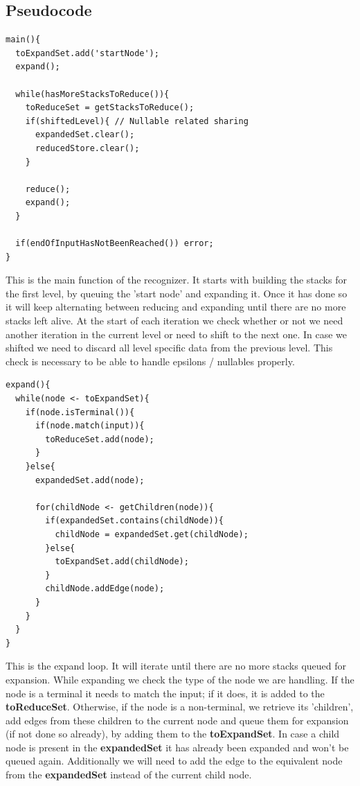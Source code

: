 \documentclass[a4paper,10pt]{article}
\begin{document}
\subsection{Pseudocode}

{\small
\begin{verbatim}
main(){
  toExpandSet.add('startNode');
  expand();
  
  while(hasMoreStacksToReduce()){
    toReduceSet = getStacksToReduce();
    if(shiftedLevel){ // Nullable related sharing
      expandedSet.clear();
      reducedStore.clear();
    }
    
    reduce();
    expand();
  }
  
  if(endOfInputHasNotBeenReached()) error;
}
\end{verbatim}
}

This is the main function of the recognizer. It starts with building the stacks for the first level, by queuing the 'start node' and expanding it. Once it has done so it will keep alternating between reducing and expanding until there are no more stacks left alive. At the start of each iteration we check whether or not we need another iteration in the current level or need to shift to the next one. In case we shifted we need to discard all level specific data from the previous level. This check is necessary to be able to handle epsilons / nullables properly.

{\small
\begin{verbatim}
expand(){
  while(node <- toExpandSet){
    if(node.isTerminal()){
      if(node.match(input)){
        toReduceSet.add(node);
      }
    }else{
      expandedSet.add(node);
      
      for(childNode <- getChildren(node)){
        if(expandedSet.contains(childNode)){
          childNode = expandedSet.get(childNode);
        }else{
          toExpandSet.add(childNode);
        }
        childNode.addEdge(node);
      }
    }
  }
}
\end{verbatim}
}

This is the expand loop. It will iterate until there are no more stacks queued for expansion. While expanding we check the type of the node we are handling. If the node is a terminal it needs to match the input; if it does, it is added to the {\bf toReduceSet}. Otherwise, if the node is a non-terminal, we retrieve its 'children', add edges from these children to the current node and queue them for expansion (if not done so already), by adding them to the {\bf toExpandSet}. In case a child node is present in the {\bf expandedSet} it has already been expanded and won't be queued again. Additionally we will need to add the edge to the equivalent node from the {\bf expandedSet} instead of the current child node.
\end{document}
